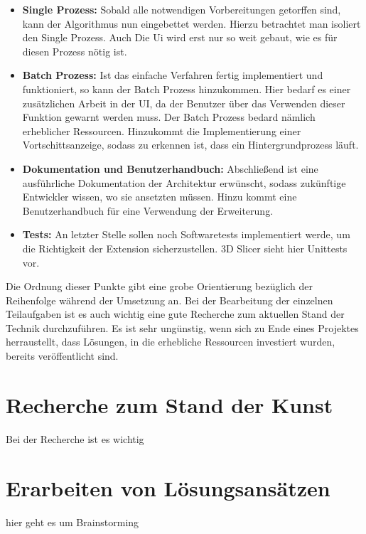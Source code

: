 \begin{itemize}
	\item \textbf{Single Prozess:} Sobald alle notwendigen Vorbereitungen
		getorffen sind, kann der Algorithmus nun eingebettet werden. Hierzu
		betrachtet man isoliert den Single Prozess. Auch Die Ui wird erst nur so weit
		gebaut, wie es für diesen Prozess nötig ist.

	\item \textbf{Batch Prozess:} Ist das einfache Verfahren fertig implementiert
		und funktioniert, so kann der Batch Prozess hinzukommen. Hier bedarf es
		einer zusätzlichen Arbeit in der UI, da der Benutzer über das Verwenden dieser
		Funktion gewarnt werden muss. Der Batch Prozess bedard nämlich erheblicher
		Ressourcen. Hinzukommt die Implementierung einer Vortschittsanzeige, sodass
		zu erkennen ist, dass ein Hintergrundprozess läuft.

	\item \textbf{Dokumentation und Benutzerhandbuch:} Abschließend ist eine
		ausführliche Dokumentation der Architektur erwünscht, sodass zukünftige Entwickler
		wissen, wo sie ansetzten müssen. Hinzu kommt eine Benutzerhandbuch für eine Verwendung
		der Erweiterung.

	\item \textbf{Tests:} An letzter Stelle sollen noch Softwaretests
		implementiert werde, um die Richtigkeit der Extension sicherzustellen. 3D
		Slicer sieht hier Unittests vor.
\end{itemize}

Die Ordnung dieser Punkte gibt eine grobe Orientierung bezüglich der Reihenfolge
während der Umsetzung an. Bei der Bearbeitung der einzelnen Teilaufgaben ist es
auch wichtig eine gute Recherche zum aktuellen Stand der Technik durchzuführen. Es
ist sehr ungünstig, wenn sich zu Ende eines Projektes herraustellt, dass Lösungen,
in die erhebliche Ressourcen investiert wurden, bereits veröffentlicht sind.

\section{Recherche zum Stand der Kunst}
\label{sec:recherche} Bei der Recherche ist es wichtig

\section{Erarbeiten von Lösungsansätzen}
\label{sec:lösungsansätze} hier geht es um Brainstorming


